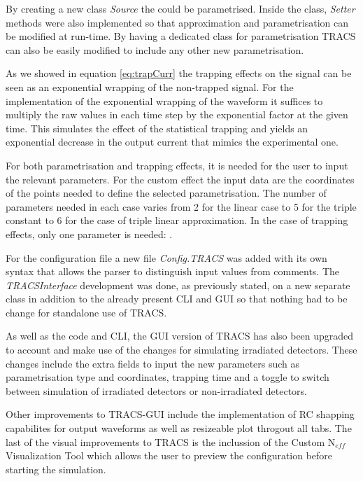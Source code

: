 By creating a new class \textit{Source} the \neff could be parametrised. Inside the class, \emph{Setter} methods were also implemented so that \neff approximation and parametrisation can be modified at run-time. By having a dedicated class for \neff parametrisation TRACS can also be easily modified to include any other new parametrisation. 

As we showed in equation \ref{eq:trapCurr} the trapping effects on the signal can be seen as an exponential wrapping of the non-trapped signal. For the implementation of the exponential wrapping of the waveform it suffices to multiply the raw values in each time step by the exponential factor at the given time. This simulates the effect of the statistical trapping and yields an exponential decrease in the output current that mimics the experimental one.

For both \neff parametrisation and trapping effects, it is needed for the user to input the relevant parameters. For the custom \neff effect the input data are the coordinates of the points needed to define the selected \neff parametrisation. The number of parameters needed in each case varies from 2 for the linear case to 5 for the triple constant \neff to 6 for the case of triple linear approximation. In the case of trapping effects, only one parameter is needed: \tau.

For the configuration file a new file \textit{Config.TRACS} was added with its own syntax that allows the parser to distinguish input values from comments. The \textit{TRACSInterface} development was done, as previously stated, on a new separate class in addition to the already present CLI and GUI so that nothing had to be change for standalone use of TRACS.

As well as the code and CLI, the GUI version of TRACS has also been upgraded to account and make use of the changes for simulating irradiated detectors. These changes include the extra fields to input the new parameters such as \neff parametrisation type and coordinates, trapping time and a toggle to switch between simulation of irradiated detectors or non-irradiated detectors. 

Other improvements to TRACS-GUI include the implementation of RC shapping capabilites for output waveforms as well as resizeable plot throgout all tabs. The last of the visual improvements to TRACS is the inclussion of the Custom N$_{eff}$ Visualization Tool which allows the user to preview the \neff configuration before starting the simulation.

